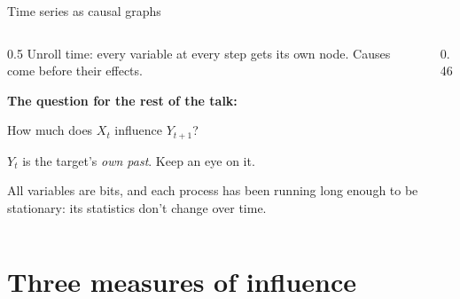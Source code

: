 \documentclass[aspectratio=169,11pt,xcolor={table}]{beamer}
\newcommand{\Xt}{X_t}
\newcommand{\Yt}{Y_t}
\newcommand{\Yn}{Y_{t+1}}
\newcommand{\aside}[1]{{\color{muted}\small #1}}
\begin{document}
\begin{frame}{Time series as causal graphs}
  \begin{columns}[c]
    \begin{column}{0.5\textwidth}
      Unroll time: every variable at every step gets its own node.
      Causes come before their effects.
      \bigskip

      \textbf{The question for the rest of the talk:}
      \begin{center}
        How much does $\Xt$ influence $\Yn$?
      \end{center}
      \medskip
      $\Yt$ is the target's \emph{own past}. Keep an eye on it.
      \bigskip

      \aside{All variables are bits, and each process has been running long enough to be
      stationary: its statistics don't change over time.}
    \end{column}
    \begin{column}{0.46\textwidth}
      \centering
    \end{column}
  \end{columns}
\end{frame}

\section{Three measures of influence}
\end{document}
